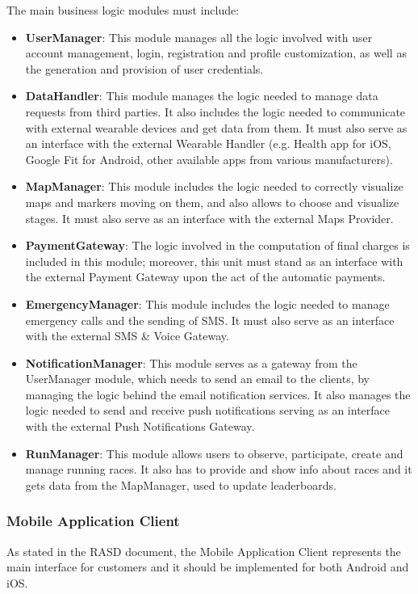 The main business logic modules must include:
\begin{itemize}
\item \textbf{UserManager}: This module manages all the logic involved with user account management, login, registration and profile customization, as well as the generation and provision of user credentials.

\item \textbf{DataHandler}: This module manages the logic needed to manage data requests from third parties. It also includes the logic needed to communicate with external wearable devices and get data from them. It must also serve as an interface with the external Wearable Handler (e.g. Health app for iOS, Google Fit for Android, other available apps from various manufacturers).

\item \textbf{MapManager}: This module includes the logic needed to correctly visualize maps and markers moving on them, and also allows to choose and visualize stages. It must also serve as an interface with the external Maps Provider.

\item \textbf{PaymentGateway}: The logic involved in the computation of final charges is included in this module; moreover, this unit must stand as an interface with the external Payment Gateway upon the act of the automatic payments.

\item \textbf{EmergencyManager}: This module includes the logic needed to manage emergency calls and the sending of SMS. It must also serve as an interface with the external SMS \& Voice Gateway.

\item \textbf{NotificationManager}: This module serves as a gateway from the UserManager module, which needs to send an email to the clients, by managing the logic behind the email notification services. It also manages the logic needed to send and receive push notifications serving as an interface with the external Push Notifications Gateway.

\item \textbf{RunManager}: This module allows users to observe, participate, create and manage running races. It also has to provide and show info about races and it gets data from the MapManager, used to update leaderboards.
\end{itemize}

\subsubsection{Mobile Application Client}
As stated in the RASD document, the Mobile Application Client represents the main interface for customers and it should be implemented for both Android and iOS.


